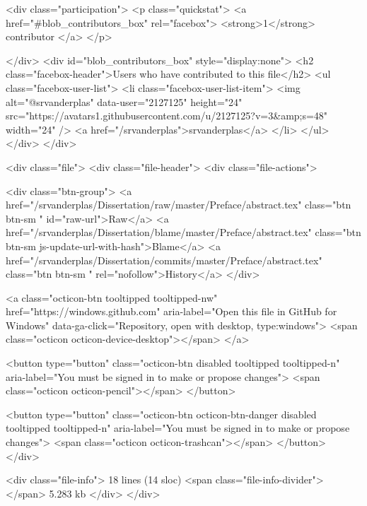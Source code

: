     <div class="participation">
      <p class="quickstat">
        <a href="#blob_contributors_box" rel="facebox">
          <strong>1</strong>
           contributor
        </a>
      </p>
      
    </div>
    <div id="blob_contributors_box" style="display:none">
      <h2 class="facebox-header">Users who have contributed to this file</h2>
      <ul class="facebox-user-list">
          <li class="facebox-user-list-item">
            <img alt="@srvanderplas" data-user="2127125" height="24" src="https://avatars1.githubusercontent.com/u/2127125?v=3&amp;s=48" width="24" />
            <a href="/srvanderplas">srvanderplas</a>
          </li>
      </ul>
    </div>
  </div>

<div class="file">
  <div class="file-header">
    <div class="file-actions">

      <div class="btn-group">
        <a href="/srvanderplas/Dissertation/raw/master/Preface/abstract.tex" class="btn btn-sm " id="raw-url">Raw</a>
          <a href="/srvanderplas/Dissertation/blame/master/Preface/abstract.tex" class="btn btn-sm js-update-url-with-hash">Blame</a>
        <a href="/srvanderplas/Dissertation/commits/master/Preface/abstract.tex" class="btn btn-sm " rel="nofollow">History</a>
      </div>

        <a class="octicon-btn tooltipped tooltipped-nw"
           href="https://windows.github.com"
           aria-label="Open this file in GitHub for Windows"
           data-ga-click="Repository, open with desktop, type:windows">
            <span class="octicon octicon-device-desktop"></span>
        </a>

          <button type="button" class="octicon-btn disabled tooltipped tooltipped-n" aria-label="You must be signed in to make or propose changes">
            <span class="octicon octicon-pencil"></span>
          </button>

        <button type="button" class="octicon-btn octicon-btn-danger disabled tooltipped tooltipped-n" aria-label="You must be signed in to make or propose changes">
          <span class="octicon octicon-trashcan"></span>
        </button>
    </div>

    <div class="file-info">
        18 lines (14 sloc)
        <span class="file-info-divider"></span>
      5.283 kb
    </div>
  </div>
  
